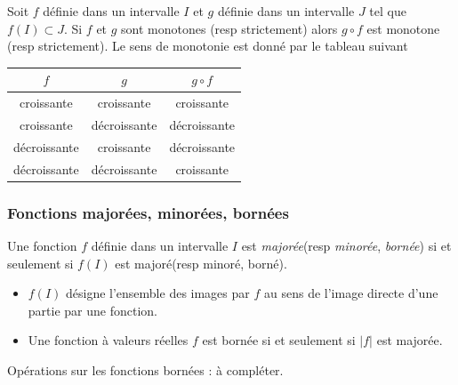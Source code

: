 \begin{prop}
 Soit $f$ définie dans un intervalle $I$ et $g$ définie dans un intervalle $J$ tel que $f(I)\subset J$. Si $f$ et $g$ sont monotones (resp strictement) alors $g\circ f$ est monotone (resp strictement). Le sens de monotonie est donné par le tableau suivant
\begin{center}
\renewcommand{\arraystretch}{1.3}
\begin{tabular}{|c|c|c|}  \hline
$f$          & $g$          & $g\circ f$\\ \hline
croissante   & croissante   & croissante\\ \hline
croissante   & décroissante & décroissante\\ \hline
décroissante & croissante   & décroissante\\ \hline
décroissante & décroissante & croissante\\ \hline
\end{tabular}
\end{center}
\end{prop}

\subsubsection{Fonctions majorées, minorées, bornées}
\begin{defi}
 Une fonction $f$ définie dans un intervalle $I$ est \emph{majorée}(resp \emph{minorée}, \emph{bornée}) si et seulement si $f(I)$ est majoré(resp minoré, borné). 
\end{defi}
\begin{rems}
\begin{itemize}
 \item $f(I)$ désigne l'ensemble des images par $f$ au sens de l'image directe d'une partie par une fonction.
 \item Une fonction à valeurs réelles $f$ est bornée si et seulement si $|f|$ est majorée.
\end{itemize}
\end{rems}
Opérations sur les fonctions bornées : à compléter.



